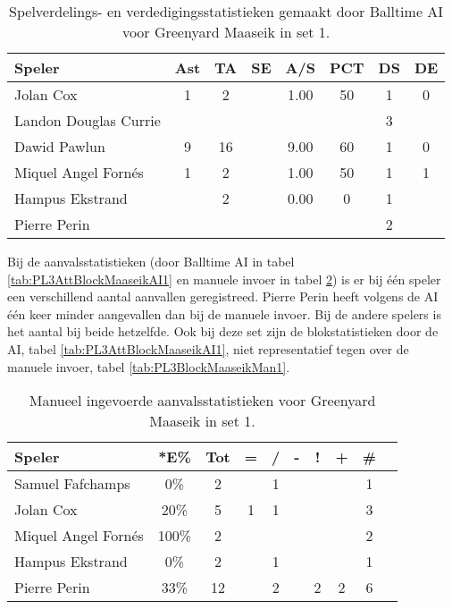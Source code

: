 \begin{table}[ht!]
  \centering
  \scriptsize
  \begin{tabular}{|l|c|c|c|c|c|c|c|} \hline
    \textbf{Speler} & Ast & TA & SE & A/S & PCT & DS & DE \\ \hline
    Jolan Cox & 1 & 2 &  & 1.00 & 50 & 1 & 0 \\
    Landon Douglas Currie &  &  &  &   &   & 3 &   \\
    Dawid Pawlun & 9 & 16 &  & 9.00 & 60 & 1 & 0 \\
    Miquel Angel Fornés & 1 & 2 &  & 1.00 & 50 & 1 & 1 \\
    Hampus Ekstrand &  & 2 &  & 0.00 & 0 & 1 & \\
    Pierre Perin &   &   &   &   &   & 2 &   \\ \hline
  \end{tabular}
  \caption[Spelverdelings- en verdedigingsstatistieken gemaakt door Balltime AI voor Greenyard Maaseik in set 1]{\label{tab:PL3SetDigMaaseikAI1}Spelverdelings- en verdedigingsstatistieken gemaakt door Balltime AI voor Greenyard Maaseik in set 1.}
\end{table}

Bij de aanvalsstatistieken (door Balltime AI in tabel \ref{tab:PL3AttBlockMaaseikAI1} en manuele invoer in tabel \ref{tab:PL3AttMaaseikMan1}) is er bij één speler een verschillend aantal aanvallen geregistreed. Pierre Perin heeft volgens de AI één keer minder aangevallen dan bij de manuele invoer. Bij de andere spelers is het aantal bij beide hetzelfde. Ook bij deze set zijn de blokstatistieken door de AI, tabel \ref{tab:PL3AttBlockMaaseikAI1}, niet representatief tegen over de manuele invoer, tabel \ref{tab:PL3BlockMaaseikMan1}.

\begin{table}[ht!]
    \centering
    \scriptsize
    \begin{tabular}{|l|c|c|c|c|c|c|c|c|c|} \hline
        \textbf{Speler} & *E\% & Tot & = & / & - & ! & + & \# \\ \hline
        Samuel Fafchamps & 0\% & 2 &  & 1 &  &  &  & 1 \\ 
        Jolan Cox & 20\% & 5 & 1 & 1 &  &  &  & 3 \\ 
        Miquel Angel Fornés & 100\% & 2 &  &  &  &  &  & 2 \\ 
        Hampus Ekstrand & 0\% & 2 &  & 1 &  &  &  & 1 \\ 
        Pierre Perin & 33\% & 12 &  & 2 &  & 2 & 2 & 6 \\ \hline
    \end{tabular}
    \caption[Manueel ingevoerde aanvalsstatistieken voor Greenyard Maaseik in set 1]{\label{tab:PL3AttMaaseikMan1}Manueel ingevoerde aanvalsstatistieken voor Greenyard Maaseik in set 1.}
\end{table}

